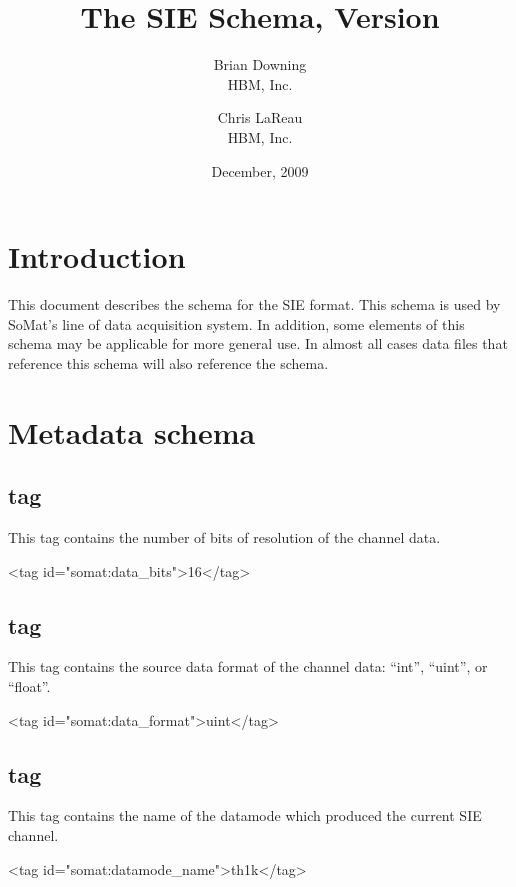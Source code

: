 \documentclass{article}
\title{The \xml{somat} SIE Schema, Version \somatver{}}
\author{
Brian Downing \\ HBM, Inc. \and
Chris LaReau \\ HBM, Inc.
}
\date{December, 2009}
\begin{document}
\maketitle

\section{Introduction}

This document describes the  schema for the SIE format.
This schema is used by SoMat's line of data acquisition system.  In
addition, some elements of this schema may be applicable for more
general use.  In almost all cases data files that reference this
schema will also reference the  schema.

\section{Metadata schema}

\subsection{ tag}

This tag contains the number of bits of resolution of the channel data.

\begin{siexmlexample}
<tag id="somat:data_bits">16</tag>
\end{siexmlexample}

\subsection{ tag}

This tag contains the source data format of the channel data:
``int'', ``uint'', or ``float''.

\begin{siexmlexample}
<tag id="somat:data_format">uint</tag>
\end{siexmlexample}

\subsection{ tag}

This tag contains the name of the datamode which produced the current
SIE channel.

\begin{siexmlexample}
<tag id="somat:datamode_name">th1k</tag>
\end{siexmlexample}
\end{document}
